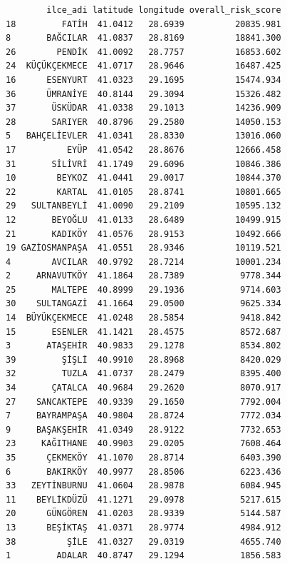 \documentclass[
  11pt,
  a4paper,
  DIV=11,
  numbers=noendperiod]{scrartcl}
\begin{document}
\begin{verbatim}
        ilce_adi latitude longitude overall_risk_score
18         FATİH  41.0412   28.6939          20835.981
8       BAĞCILAR  41.0837   28.8169          18841.300
26        PENDİK  41.0092   28.7757          16853.602
24  KÜÇÜKÇEKMECE  41.0717   28.9646          16487.425
16      ESENYURT  41.0323   29.1695          15474.934
36      ÜMRANİYE  40.8144   29.3094          15326.482
37       ÜSKÜDAR  41.0338   29.1013          14236.909
28       SARIYER  40.8796   29.2580          14050.153
5   BAHÇELİEVLER  41.0341   28.8330          13016.060
17          EYÜP  41.0542   28.8676          12666.458
31       SİLİVRİ  41.1749   29.6096          10846.386
10        BEYKOZ  41.0441   29.0017          10844.370
22        KARTAL  41.0105   28.8741          10801.665
29   SULTANBEYLİ  41.0090   29.2109          10595.132
12       BEYOĞLU  41.0133   28.6489          10499.915
21       KADIKÖY  41.0576   28.9153          10492.666
19 GAZİOSMANPAŞA  41.0551   28.9346          10119.521
4        AVCILAR  40.9792   28.7214          10001.234
2     ARNAVUTKÖY  41.1864   28.7389           9778.344
25       MALTEPE  40.8999   29.1936           9714.603
30    SULTANGAZİ  41.1664   29.0500           9625.334
14  BÜYÜKÇEKMECE  41.0248   28.5854           9418.842
15       ESENLER  41.1421   28.4575           8572.687
3       ATAŞEHİR  40.9833   29.1278           8534.802
39         ŞİŞLİ  40.9910   28.8968           8420.029
32         TUZLA  41.0737   28.2479           8395.400
34       ÇATALCA  40.9684   29.2620           8070.917
27    SANCAKTEPE  40.9339   29.1650           7792.004
7     BAYRAMPAŞA  40.9804   28.8724           7772.034
9     BAŞAKŞEHİR  41.0349   28.9122           7732.653
23     KAĞITHANE  40.9903   29.0205           7608.464
35      ÇEKMEKÖY  41.1070   28.8714           6403.390
6       BAKIRKÖY  40.9977   28.8506           6223.436
33   ZEYTİNBURNU  41.0604   28.9878           6084.945
11    BEYLİKDÜZÜ  41.1271   29.0978           5217.615
20      GÜNGÖREN  41.0203   28.9339           5144.587
13      BEŞİKTAŞ  41.0371   28.9774           4984.912
38          ŞİLE  41.0327   29.0319           4655.740
1         ADALAR  40.8747   29.1294           1856.583
\end{verbatim}
\end{document}
